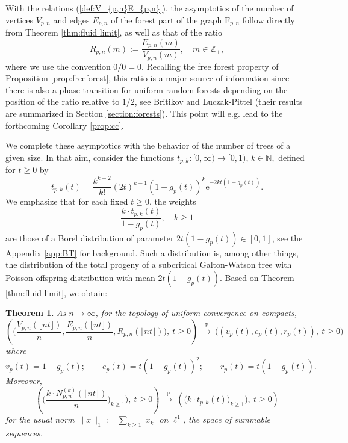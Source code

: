 \documentclass[a4, 11pt]{article}
\numberwithin{equation}{section}
\theoremstyle{plain}
\newtheorem{theorem}{Theorem}[section]
\theoremstyle{definition}
\theoremstyle{remark}
\begin{document}
With the relations (\ref{def:V_{p,n}E_{p,n}}), the asymptotics of the number of vertices $V_{p,n}$ and edges $E_{p,n}$ of the forest part of the graph $\mathrm{F}_{p,n}$ follow directly from Theorem \ref{thm:fluid limit}, as well as that of the ratio
$$
R_{p,n}(m):=\frac{E_{p,n}(m)}{V_{p,n}(m)}, \quad m \in \mathbb Z_+,
$$
where we use the convention $0/0=0$.
Recalling the free forest property of Proposition \ref{prop:freeforest}, this ratio is a major source of information since there is also a phase transition for uniform random forests depending on the position of the ratio relative to $1/2$, see Britikov \cite{britikov88} and Luczak-Pittel \cite{LuczakPittel92} (their results are summarized in Section \ref{section:forests}). This point will e.g. lead to the forthcoming Corollary \ref{prop:cc}. 

We complete these asymptotics with the behavior of the number of trees of a given size. In that aim, consider the functions $t_{p,k}:[0,\infty) \rightarrow [0,1)$, $k \in \mathbb N,$ defined for $t \geq 0$ by 
\begin{equation}\label{def:t_pk}
	t_{p,k}(t)=\frac{k^{k-2}}{k!}\left(2t\right)^{k-1}\left(1-g_p(t)\right)^k \mathrm{e}^{-2kt\left(1-g_p(t)\right)}.
\end{equation}
We emphasize that for each fixed $t \geq 0$, the weights
$$
\frac{k \cdot t_{p,k}(t)}{1-g_p(t)}, \quad k \geq 1
$$
are those of a Borel distribution of parameter $2t(1-g_p(t)) \in [0,1]$, see the Appendix \ref{app:BT} for background. Such a  distribution is, among other things, the distribution of the total progeny of a subcritical Galton-Watson tree with Poisson offspring distribution with mean $2t(1-g_p(t))$. Based on Theorem \ref{thm:fluid limit}, we obtain:

\begin{theorem}
\label{thm:forest}
As $n \rightarrow \infty$, for the topology of uniform convergence on compacts,
$$\left(\bigg(\frac{V_{p,n}(\lfloor nt\rfloor)}{n}, \frac{E_{p,n}(\lfloor nt\rfloor)}{n}, R_{p,n}(\lfloor nt\rfloor)\bigg), ~ t\geq 0\right) ~\overset{\mathbb P}\longrightarrow ~\Big((v_p(t),e_p(t),r_p(t)),~ t\geq 0 \Big)$$
where
$$
v_p(t)=1-g_p(t); \qquad e_p(t)=t(1-g_p(t))^2; \qquad r_p(t)=t(1-g_p(t)). 
$$
Moreover,
$$\left(\bigg(\frac{k \cdot N_{p,n}^{(k)}(\lfloor nt\rfloor)}{n}\bigg)_{k\geq 1}\bigg),~ t\geq 0\right)~\overset{\mathbb P}\longrightarrow~\left(\big(k\cdot t_{p,k}(t) \big)_{k\geq 1}\big), ~t\geq 0 \right)$$
for the usual norm $\|x\|_1:=\sum_{k\geq 1}|x_k|$ on $\ell^1$, the space of summable sequences. 
\end{theorem}
\end{document}

